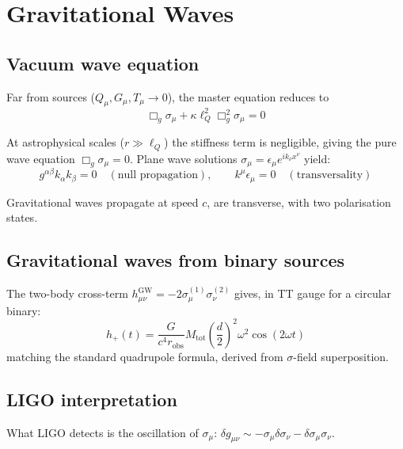 \documentclass[11pt,a4paper]{article}
\theoremstyle{plain}
\theoremstyle{definition}
\theoremstyle{remark}
\newcommand{\lQ}{\ell_Q}
\begin{document}
\section{Gravitational Waves}
\label{sec:gw}

\subsection{Vacuum wave equation}

Far from sources ($Q_\mu, G_\mu, T_\mu \to 0$), the master equation reduces to
\begin{equation}
  \Box_g\sigma_\mu + \kappa\lQ^2\Box_g^2\sigma_\mu = 0
\end{equation}

At astrophysical scales ($r \gg \lQ$) the stiffness term is negligible, giving the pure wave equation $\Box_g\sigma_\mu = 0$.  Plane wave solutions $\sigma_\mu = \epsilon_\mu e^{ik_\nu x^\nu}$ yield:
\begin{equation}
  g^{\alpha\beta}k_\alpha k_\beta = 0 \quad(\text{null propagation}), \qquad k^\mu\epsilon_\mu = 0 \quad(\text{transversality})
\end{equation}

Gravitational waves propagate at speed $c$, are transverse, with two polarisation states.

\subsection{Gravitational waves from binary sources}

The two-body cross-term $h_{\mu\nu}^{\mathrm{GW}} = -2\sigma_\mu^{(1)}\sigma_\nu^{(2)}$ gives, in TT gauge for a circular binary:
\begin{equation}
  \boxed{h_+(t) = \frac{G}{c^4 r_{\mathrm{obs}}}M_{\mathrm{tot}}\!\left(\frac{d}{2}\right)^{\!2}\omega^2\cos(2\omega t)}
  \label{eq:quadrupole}
\end{equation}
matching the standard quadrupole formula, derived from $\sigma$-field superposition.

\subsection{LIGO interpretation}

What LIGO detects is the oscillation of $\sigma_\mu$: $\delta g_{\mu\nu} \sim -\sigma_\mu\delta\sigma_\nu - \delta\sigma_\mu\sigma_\nu$.
\end{document}
